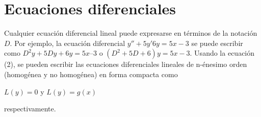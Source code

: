 \documentclass{article}
\begin{document}
\section{Ecuaciones diferenciales}Cualquier ecuación diferencial lineal puede expresarse en términos de la notación $D$. Por ejemplo, la ecuación diferencial $y''+ 5y' 6y = 5x - 3$ se puede escribir como $D^2y + 5Dy + 6y = 5x – 3$ o $(D^2 + 5D + 6)y = 5x
- 3$. Usando la ecuación (2), se pueden escribir las ecuaciones diferenciales lineales de n-énesimo orden (homogénea y no homogénea) en forma compacta como
\begin{center}
    $L(y) = 0 $ y $L(y) = g(x)$
\end{center}
respectivamente.
\printbibliography
\end{document}
